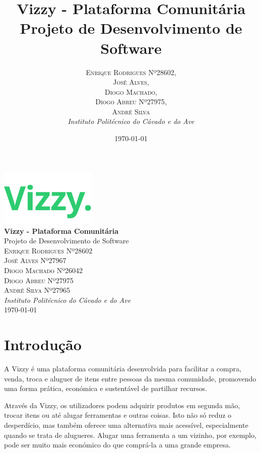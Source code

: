 \documentclass[a4paper, 12pt]{article} %
\title{\textbf{Vizzy - Plataforma Comunitária}\\ %
	Projeto de Desenvolvimento de Software} %
\author{
	\textsc{Enrique Rodrigues Nº28602}, \\
	\textsc{José Alves}, \\
	\textsc{Diogo Machado}, \\
	\textsc{Diogo Abreu Nº27975}, \\ 
	\textsc{André Silva} \\
	\textit{Instituto Politécnico do Cávado e do Ave}
}
\date{\today} %
\renewcommand{\maketitle}{
\begin{titlepage}
    \begin{center}
        \vspace*{1cm}
        \includegraphics[width=0.35\textwidth]{../images/logo-no-bg.png}\\[1cm] %
        {\Huge\textbf{Vizzy - Plataforma Comunitária}}\\[0.5cm] %
        {\Large Projeto de Desenvolvimento de Software}\\[2cm] %
        {\large \textsc{
        Enrique Rodrigues Nº28602 \\
        José Alves Nº27967 \\
        Diogo Machado Nº26042 \\
        Diogo Abreu Nº27975 \\
        André Silva Nº27965}}\\[0.5cm] %
        {\textit{Instituto Politécnico do Cávado e do Ave}}\\[1.5cm] %
        {\large \today} %
        \vfill
    \end{center}
\end{titlepage}
}
\begin{document}
\maketitle %







\newpage
\section{Introdução}

A Vizzy é uma plataforma comunitária desenvolvida para facilitar a compra, venda, troca e aluguer de itens entre pessoas da mesma comunidade, promovendo uma forma prática, económica e sustentável de partilhar recursos.

Através da Vizzy, os utilizadores podem adquirir produtos em segunda mão, trocar itens ou até alugar ferramentas e outras coisas. Isto não só reduz o desperdício, mas também oferece uma alternativa mais acessível, especialmente quando se trata de alugueres. Alugar uma ferramenta a um vizinho, por exemplo, pode ser muito mais económico do que comprá-la a uma grande empresa.
\end{document}
